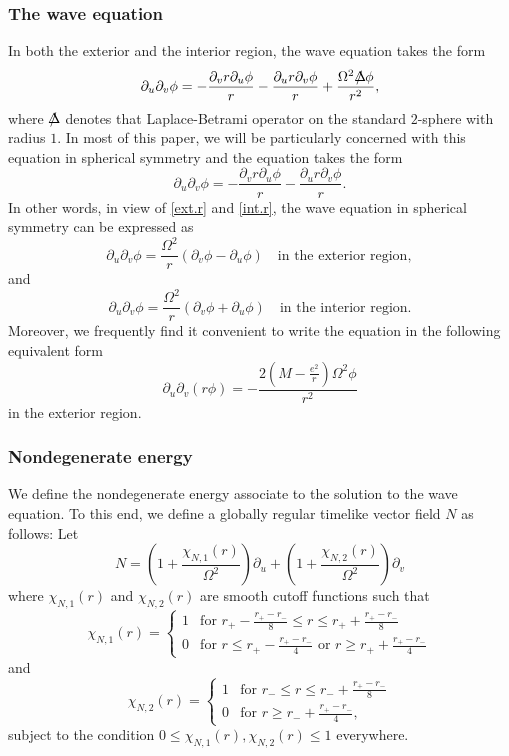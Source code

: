 \documentclass[12 pt, reqno]{amsart}
\theoremstyle{definition}
\theoremstyle{remark}
\numberwithin{equation}{section}
\newcommand{\rd}{\partial}
\newcommand{\0}{\emptyset}
\newcommand{\Omg}{\Omega}
\newcommand{\lapp}{{\Delta} \mkern-13mu /\,}
\newcommand{\f}{\frac}
\begin{document}
\subsubsection{The wave equation}
In both the exterior and the interior region, the wave equation takes the form
$$\rd_u\rd_v\phi=-\f{\rd_v r \rd_u\phi}{r}-\f{\rd_u r \rd_v\phi}{r}+\f{\Omg^2 \lapp\phi}{r^2},$$
where $\lapp$ denotes that Laplace-Betrami operator on the standard $2$-sphere with radius $1$. 
In most of this paper, we will be particularly concerned with this equation in spherical symmetry and the equation takes the form
$$\rd_u\rd_v\phi=-\f{\rd_v r \rd_u\phi}{r}-\f{\rd_u r \rd_v\phi}{r}.$$
In other words, in view of \eqref{ext.r} and \eqref{int.r}, the wave equation in spherical symmetry can be expressed as
\begin{equation}\label{wave.eqn.ext}
\rd_u\rd_v\phi=\f{\Omg^2}{r}(\rd_v\phi-\rd_u\phi)\quad\mbox{in the exterior region},
\end{equation}
and
\begin{equation}\label{wave.eqn.int}
\rd_u\rd_v\phi=\f{\Omg^2}{r}(\rd_v\phi+\rd_u\phi)\quad\mbox{in the interior region}.
\end{equation}
Moreover, we frequently find it convenient to write the equation in the following equivalent form
\begin{equation}\label{re.wave.eqn.ext}
\rd_u\rd_v (r\phi)=-\f{2(M-\f{e^2}{r})\Omg^2\phi}{r^2}
\end{equation}
in the exterior region.

\subsubsection{Nondegenerate energy}\label{sec.nondegenerate}
We define the nondegenerate energy associate to the solution to the wave equation. To this end, we define a globally regular timelike vector field $N$ as follows: Let
\begin{equation}
N=(1+\f{\chi_{N,1}(r)}{\Omg^2})\rd_u+(1+\f{\chi_{N,2}(r)}{\Omg^2})\rd_v
\end{equation}
where $\chi_{N,1}(r)$ and $\chi_{N,2}(r)$ are smooth cutoff functions such that 
\begin{equation*}
\chi_{N,1}(r)=
\begin{cases}
1 &\mbox{for }r_+-\f{r_+-r_-}{8}\leq r\leq r_++\f{r_+-r_-}{8}\\
0 &\mbox{for }r\leq r_+-\f{r_+-r_-}{4}\mbox{ or }r\geq r_++\f{r_+-r_-}{4}
\end{cases}
\end{equation*}
and
\begin{equation*}
\chi_{N,2}(r) =
\begin{cases}
1 &\mbox{for }r_-\leq r\leq r_-+\f{r_+-r_-}{8}\\
0 &\mbox{for }r\geq r_-+\f{r_+-r_-}{4},
\end{cases}
\end{equation*}
subject to the condition $0\leq \chi_{N,1}(r), \chi_{N,2}(r)\leq 1$ everywhere.
\end{document}
